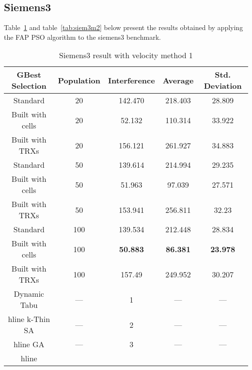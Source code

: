 \subsection{Siemens3}
Table~\ref{tab:siem3m1} and table~\ref{tab:siem3m2} below present the results obtained by applying the FAP PSO algorithm to the siemens3 benchmark.
\begin{table}[H]
\centering
	\begin{tabular}{| c | c | c | c | c |}
	\hline
	GBest Selection & Population & Interference & Average & Std. Deviation\\ \hline
	Standard & 20 & 142.470 & 218.403 & 28.809\\ \hline
	Built with cells & 20 & 52.132 & 110.314 & 33.922\\ \hline
	Built with TRXs & 20 & 156.121 & 261.927 & 34.883\\ \hline
	Standard & 50 & 139.614 & 214.994 & 29.235\\ \hline
	Built with cells & 50 & 51.963 & 97.039 & 27.571\\ \hline
	Built with TRXs & 50 & 153.941 & 256.811 & 32.23\\ \hline
	Standard & 100 & 139.534 & 212.448 & 28.834\\ \hline
	Built with cells & 100 & \textbf{50.883} & \textbf{86.381} & \textbf{23.978}\\ \hline
	Built with TRXs & 100 & 157.49 & 249.952 & 30.207\\ \hline
    Dynamic Tabu & --- & 1 & --- & --- \\hline
    k-Thin SA & --- & 2 & --- & --- \\hline
    GA & --- & 3 & --- & --- \\hline
	\end{tabular}
\caption{Siemens3 result with velocity method 1}
\label{tab:siem3m1}
\end{table}
